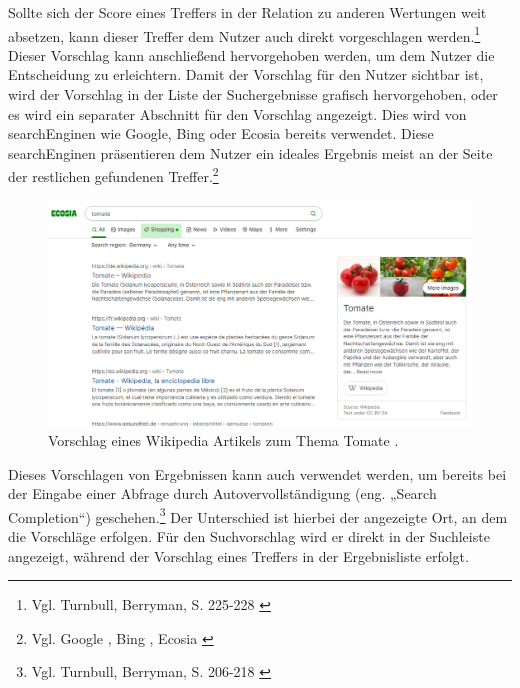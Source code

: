 Sollte sich der Score eines Treffers in der Relation zu anderen Wertungen weit absetzen, kann dieser Treffer dem Nutzer auch direkt vorgeschlagen werden.\footnote{Vgl. Turnbull, Berryman, S. 225-228 \cite{turnbull2016}}
Dieser Vorschlag kann anschließend hervorgehoben werden, um dem Nutzer die Entscheidung zu erleichtern. Damit der Vorschlag für den Nutzer sichtbar ist, wird der Vorschlag in der Liste der Suchergebnisse grafisch hervorgehoben, oder es wird ein separater Abschnitt für den Vorschlag angezeigt.
Dies wird von \gls{searchEngine}n wie Google, Bing oder Ecosia bereits verwendet.
Diese \gls{searchEngine}n präsentieren dem Nutzer ein ideales Ergebnis meist an der Seite der restlichen gefundenen Treffer.\footnote{Vgl. Google \cite{google2022}, Bing \cite{bing2022}, Ecosia \cite{ecosia2022}}

\begin{figure}[h]
  \begin{centering}
    \includegraphics[width=\textwidth]{figures/foundations/tomato.png}
    \caption{Vorschlag eines Wikipedia Artikels zum Thema Tomate \cite{ecosia2022}.}
    \label{fig:tomate}
  \end{centering}
\end{figure}

\clearpage
Dieses Vorschlagen von Ergebnissen kann auch verwendet werden, um bereits bei der Eingabe einer Abfrage durch Autovervollständigung (eng. „Search Completion“) geschehen.\footnote{Vgl. Turnbull, Berryman, S. 206-218 \cite{turnbull2016}}
Der Unterschied ist hierbei der angezeigte Ort, an dem die Vorschläge erfolgen.
Für den Suchvorschlag wird er direkt in der Suchleiste angezeigt, während der Vorschlag eines Treffers in der Ergebnisliste erfolgt.

